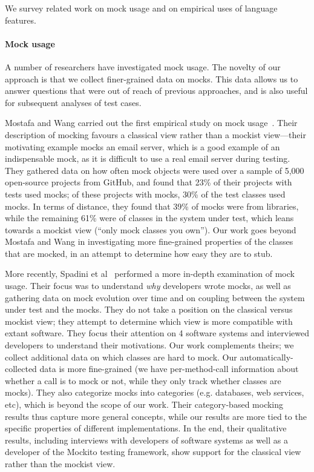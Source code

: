 \label{sec:related}
We survey related work on mock usage and on empirical uses of language features.

\paragraph{Mock usage} A number of researchers have investigated mock usage. The novelty of our approach is that we collect finer-grained data on mocks. This data allows us to answer questions that were out of reach of previous approaches, and is also useful for subsequent analyses of test cases.

Mostafa and Wang carried out the first empirical study on mock usage~\cite{mostafa14:_empir_study_usage_mockin_framew_softw_testin}. Their description of mocking favours a classical view rather than a mockist view---their motivating example mocks an email server, which is a good example of an indispensable mock, as it is difficult to use a real email server during testing. They gathered data on how often mock objects were used over a sample of 5,000 open-source projects from GitHub, and found that 23\% of their projects with tests used mocks; of these projects with mocks, 30\% of the test classes used mocks. In terms of distance, they found that 39\% of mocks were from libraries, while the remaining 61\% were of classes in the system under test, which leans towards a mockist view (``only mock classes you own''). Our work goes beyond Mostafa and Wang in investigating more fine-grained properties of the classes that are mocked, in an attempt to determine how easy they are to stub.

More recently, Spadini et al~\cite{spadini19:_mock_java} performed a more in-depth examination of mock usage. Their focus was to understand \emph{why} developers wrote mocks, as well as gathering data on mock evolution over time and on coupling between the system under test and the mocks. They do not take a position on the classical versus mockist view; they attempt to determine which view is more compatible with extant software. They focus their attention on 4 software systems and interviewed developers to understand their motivations. Our work complements theirs; we collect additional data on which classes are hard to mock. Our automatically-collected data is more fine-grained (we have per-method-call information about whether a call is to mock or not, while they only track whether classes are mocks). They also categorize mocks into categories (e.g. databases, web services, etc), which is beyond the scope of our work. Their category-based mocking results thus capture more general concepts, while our results are more tied to the specific properties of different implementations. In the end, their qualitative results, including interviews with developers of software systems as well as a developer of the Mockito testing framework, show support for the classical view rather than the mockist view.

